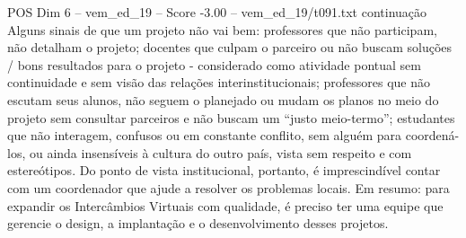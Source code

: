 \begin{textsample}{POS Dim 6 – vem\_ed\_19 – Score -3.00 – vem\_ed\_19/t091.txt}  \label{ex:f6_pos_115}
continuação Alguns sinais de que um projeto não vai bem: professores que não participam, não detalham o projeto; docentes que culpam o parceiro ou não buscam soluções / bons resultados para o projeto - considerado como atividade pontual sem continuidade e sem visão das relações interinstitucionais; professores que não escutam seus alunos, não seguem o planejado ou mudam os planos no meio do projeto sem consultar parceiros e não buscam um “justo meio-termo”; estudantes que não interagem, confusos ou em constante conflito, sem alguém para coordená-los, ou ainda insensíveis à cultura do outro país, vista sem respeito e com estereótipos.
Do ponto de vista institucional, portanto, é imprescindível contar com um coordenador que ajude a resolver os problemas locais.
Em resumo: para expandir os Intercâmbios Virtuais com qualidade, é preciso ter uma equipe que gerencie o design, a implantação e o desenvolvimento desses projetos.

\end{textsample}
